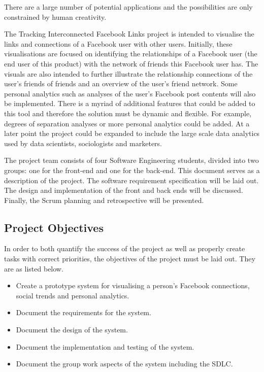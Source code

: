 \documentclass[12pt,onecolumn]{article}
\begin{document}
	There are a large number of potential applications and the possibilities are only constrained by human creativity.
	
	The Tracking Interconnected Facebook Links project is intended to visualise the links and connections of a Facebook user with other users. Initially, these visualisations are focused on identifying the relationships of a Facebook user (the end user of this product) with the network of friends this Facebook user has. The visuals are also intended to further illustrate the relationship connections of the user's friends of friends and an overview of the user's friend network. Some personal analytics such as analyses of the user's Facebook post contents will also be implemented. There is a myriad of additional features that could be added to this tool and therefore the solution must be dynamic and flexible. For example, degrees of separation analyses or more personal analytics could be added. At a later point the project could be expanded to include the large scale data analytics used by data scientists, sociologists and marketers. 
	
	The project team consists of four Software Engineering students, divided into two groups: one for the front-end and one for the back-end. This document serves as a description of the project. The software requirement specification will be laid out. The design and implementation of the front and back ends will be discussed. Finally, the Scrum planning and retrospective will be presented.
	
	\subsection{Project Objectives} %
	
	In order to both quantify the success of the project as well as properly create tasks with correct priorities, the objectives of the project must be laid out. They are as listed below.
	
	\begin{itemize}
		
		\item Create a prototype system for visualising a person's Facebook connections, social trends and personal analytics.
		
		\item Document the requirements for the system.
		
		\item Document the design of the system.
		
		\item Document the implementation and testing of the system.
		
		\item Document the group work aspects of the system including the SDLC.
		
	\end{itemize}
	
\end{document}
